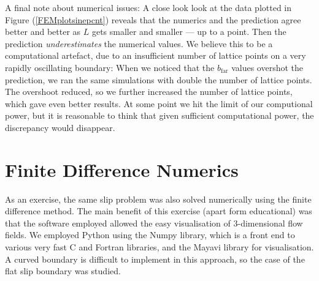 \documentclass[12pt, a4paper, twoside, openright]{book}
\newcommand{\beff}{\ensuremath{b_{\mathrm{eff}}}}
\newcommand{\bfar}{\ensuremath{b_{\mathrm{far}}}}
\begin{document}
A final note about numerical issues:  A close look look at the data plotted in Figure (\ref{FEMplotsinepcnt}) reveals that the numerics and the prediction agree better and better as $L$ gets smaller and smaller --- up to a point.  Then the prediction \emph{underestimates} the numerical values.  We believe this to be a computational artefact, due to an insufficient number of lattice points  on a very rapidly oscillating boundary:  When we noticed that the $\bfar$ values overshot the prediction, we ran the same simulations with double the number of lattice points.  The overshoot reduced, so we further increased the number of lattice points, which gave even better results.  At some point we hit the limit of our computional power, but it is reasonable to think that given sufficient computational power, the discrepancy would disappear.
  









\clearpage
\section{Finite Difference Numerics}

As an exercise, the same slip problem was also solved numerically using the finite difference method.  The main benefit of this exercise (apart form educational) was that the software employed allowed the easy visualisation of 3-dimensional flow fields.  We employed Python using the Numpy library, which is a front end to various very fast C and Fortran libraries, and the Mayavi library for visualisation.  A curved boundary is difficult to implement in this approach, so the case of the flat slip boundary was studied.
\end{document}
